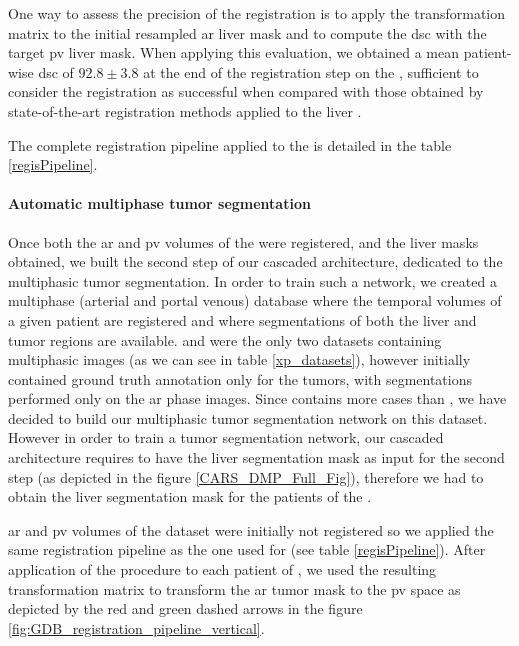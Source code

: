 One way to assess the precision of the registration is to apply the
transformation matrix to the initial resampled \ac{ar} liver mask and to
compute the \ac{dsc} with the target \ac{pv} liver mask. When applying this
evaluation, we obtained a mean patient-wise \ac{dsc} of $ 92.8 \pm 3.8 $ at the
end of the registration step on the \textbf{}, sufficient to consider the
registration as successful when compared with those obtained by state-of-the-art
registration methods applied to the liver \cite{Zhao2019}.

The complete registration pipeline applied to the \textbf{} is detailed in the table \ref{regisPipeline}.

\paragraph{Automatic multiphase tumor segmentation}\label{tcia-db-unsupervised-multiphase-tumor-segmentation}

Once both the \ac{ar} and \ac{pv} volumes of the \textbf{} were registered, and the
liver masks obtained, we built the second step of our cascaded
architecture, dedicated to the multiphasic tumor segmentation. In order
to train such a network, we created a multiphase (arterial and portal
venous) database where the temporal volumes of a given patient are
registered and where segmentations of both the liver and tumor regions
are available.
\textbf{} and \textbf{} were the only two datasets containing multiphasic
images (as we can see in table \ref{xp_datasets}), however
\textbf{} initially contained ground truth annotation only for the tumors,
with segmentations performed only on the \ac{ar} phase images.
Since \textbf{} contains more cases than \textbf{}, we have decided to
build our multiphasic tumor segmentation network on this dataset.
However in order to train a tumor segmentation network, our cascaded
architecture requires to have the liver segmentation mask as input for
the second step (as depicted in the figure \ref{CARS_DMP_Full_Fig}), therefore we had to obtain the liver segmentation
mask for the patients of the \textbf{}.

\ac{ar} and \ac{pv} volumes of the \textbf{} dataset were initially not registered so
we applied the same registration pipeline as the one used for \textbf{} (see table \ref{regisPipeline}). After application of the procedure to
each patient of \textbf{}, we used the resulting transformation matrix to
transform the \ac{ar} tumor mask to the \ac{pv} space as depicted by the red and green dashed arrows in the figure \ref{fig:GDB_registration_pipeline_vertical}.


